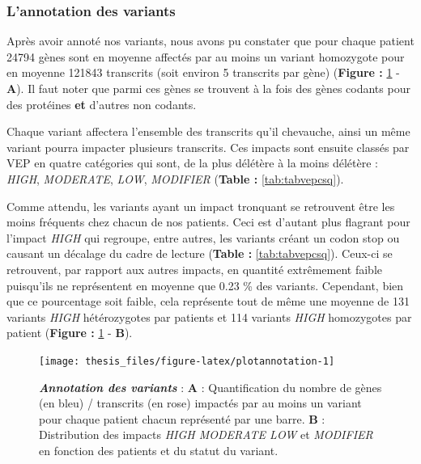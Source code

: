 \documentclass[12pt,a4paper,twoside]{ugathesis}
\theoremstyle{definition}
\theoremstyle{definition}
\theoremstyle{definition}
\theoremstyle{remark}
\begin{document}
\newpage

\subsubsection{L'annotation des
variants}\label{lannotation-des-variants-1}

Après avoir annoté nos variants, nous avons pu constater que pour chaque
patient 24794 gènes sont en moyenne affectés par au moins un variant
homozygote pour en moyenne 121843 transcrits (soit environ 5 transcrits
par gène) (\textbf{Figure : }\ref{fig:plotannotation} - \textbf{A}). Il
faut noter que parmi ces gènes se trouvent à la fois des gènes codants
pour des protéines \textbf{et} d'autres non codants.

Chaque variant affectera l'ensemble des transcrits qu'il chevauche,
ainsi un même variant pourra impacter plusieurs transcrits. Ces impacts
sont ensuite classés par VEP en quatre catégories qui sont, de la plus
délétère à la moins délétère : \emph{HIGH}, \emph{MODERATE}, \emph{LOW},
\emph{MODIFIER} (\textbf{Table : }\ref{tab:tabvepcsq}).

Comme attendu, les variants ayant un impact tronquant se retrouvent être
les moins fréquents chez chacun de nos patients. Ceci est d'autant plus
flagrant pour l'impact \emph{HIGH} qui regroupe, entre autres, les
variants créant un codon stop ou causant un décalage du cadre de lecture
(\textbf{Table : }\ref{tab:tabvepcsq}). Ceux-ci se retrouvent, par
rapport aux autres impacts, en quantité extrêmement faible puisqu'ils ne
représentent en moyenne que 0.23 \% des variants. Cependant, bien que ce
pourcentage soit faible, cela représente tout de même une moyenne de 131
variants \emph{HIGH} hétérozygotes par patients et 114 variants
\emph{HIGH} homozygotes par patient (\textbf{Figure :
}\ref{fig:plotannotation} - \textbf{B}).

\newpage

\begin{figure}

{\centering \texttt{[image: thesis\_files/figure-latex/plotannotation-1]} 

}

\caption[Annotation des variants]{\textbf{\emph{Annotation des variants}} :
\textbf{A} : Quantification du nombre de gènes (en bleu) / transcrits
(en rose) impactés par au moins un variant pour chaque patient chacun
représenté par une barre. \textbf{B} : Distribution des impacts
\emph{HIGH MODERATE LOW} et \emph{MODIFIER} en fonction des patients et
du statut du variant.}\label{fig:plotannotation}
\end{figure}
\end{document}
